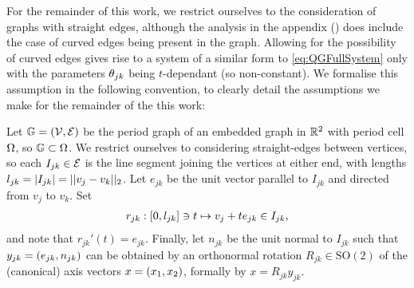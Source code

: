 For the remainder of this work, we restrict ourselves to the consideration of graphs with straight edges, although the analysis in the appendix () does include the case of curved edges being present in the graph.
Allowing for the possibility of curved edges gives rise to a system of a similar form to \eqref{eq:QGFullSystem} only with the parameters $\theta_{jk}$ being $t$-dependant (so non-constant).
We formalise this assumption in the following convention, to clearly detail the assumptions we make for the remainder of the this work:
\begin{convention} \label{conv:MeasTheoryProblemSetup}
	Let $\mathbb{G}=\left( \mathcal{V},\mathcal{E} \right)$ be the period graph of an embedded graph in $\mathbb{R}^2$ with period cell $\Omega$, so $\mathbb{G}\subset\Omega$.
	We restrict ourselves to considering straight-edges between vertices, so each $I_{jk}\in \mathcal{E}$ is the line segment joining the vertices at either end, with lengths $l_{jk} = \left\lvert I_{jk} \right\rvert = \lvert\lvert v_j-v_k \rvert\rvert_2$.
	Let $e_{jk}$ be the unit vector parallel to $I_{jk}$ and directed from $v_j$ to $v_k$.
	Set
	\begin{align} \label{eq:EdgeParameterisation}
	r_{jk}:\left[ 0, l_{jk} \right] \ni t \mapsto v_j + te_{jk} \in I_{jk},
	\end{align}
	and note that $r_{jk}'(t) = e_{jk}$.
	Finally, let $n_{jk}$ be the unit normal to $I_{jk}$ such that $y_{jk} = \left( e_{jk}, n_{jk} \right)$ can be obtained by an orthonormal rotation $R_{jk}\in\mathrm{SO}(2)$ of the (canonical) axis vectors $x = \left( x_1, x_2 \right)$, formally by $x = R_{jk}y_{jk}$.
\end{convention}

